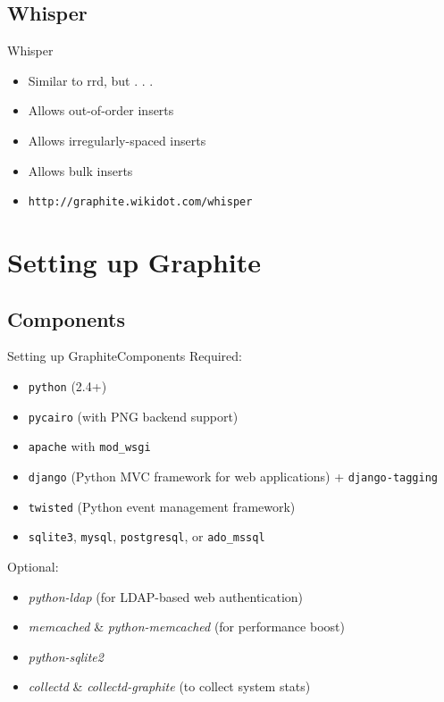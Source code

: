 \documentclass[smaller]{beamer} %
\begin{document}
\subsection{Whisper}
\begin{frame}
    Whisper

    \begin{itemize}
        \item Similar to rrd, but . . .
        \item Allows out-of-order inserts
        \item Allows irregularly-spaced inserts
        \item Allows bulk inserts
        \item {\tt http://graphite.wikidot.com/whisper}
    \end{itemize}
\end{frame}

\section{Setting up Graphite}
\subsection{Components}
\begin{frame}{Setting up Graphite}{Components}
    Required:
    \begin{itemize}
        \item {\tt python} (2.4+)
        \item {\tt pycairo} (with PNG backend support)
        \item {\tt apache} with {\tt mod\_wsgi}
        \item {\tt django} (Python MVC framework for web applications) + {\tt django-tagging}
        \item {\tt twisted} (Python event management framework)
        \item {\tt sqlite3}, {\tt mysql}, {\tt postgresql}, or {\tt ado\_mssql}
    \end{itemize}

    \vskip10pt

    Optional:
    \begin{itemize}
        \item {\it python-ldap} (for LDAP-based web authentication)
        \item {\it memcached} \& {\it python-memcached} (for performance boost)
        \item {\it python-sqlite2}
        \item {\it collectd} \& {\it collectd-graphite} (to collect system stats)
    \end{itemize}
\end{frame}
\end{document}
